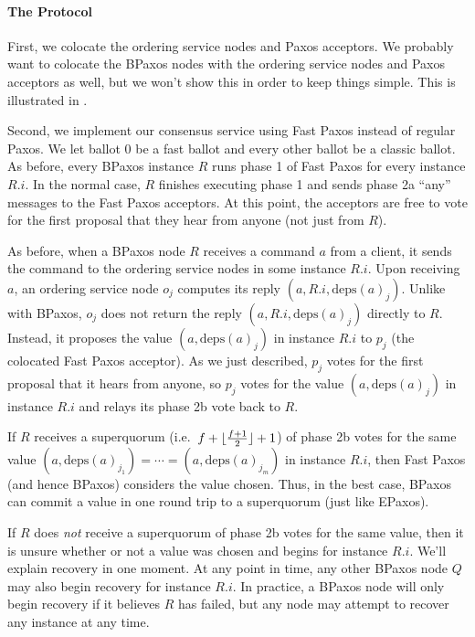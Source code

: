\documentclass{mwhittaker}
\theoremstyle{definition}
\newcommand{\deps}[1]{\text{deps}(#1)}
\begin{document}
\paragraph{The Protocol}
First, we colocate the ordering service nodes and Paxos acceptors. We probably
want to colocate the BPaxos nodes with the ordering service nodes and Paxos
acceptors as well, but we won't show this in order to keep things simple. This
is illustrated in .

{}

Second, we implement our consensus service using Fast Paxos instead of regular
Paxos. We let ballot $0$ be a fast ballot and every other ballot be a classic
ballot. As before, every BPaxos instance $R$ runs phase 1 of Fast Paxos for
every instance $R.i$. In the normal case, $R$ finishes executing phase 1 and
sends phase 2a ``any'' messages to the Fast Paxos acceptors. At this point, the
acceptors are free to vote for the first proposal that they hear from anyone
(not just from $R$).

As before, when a BPaxos node $R$ receives a command $a$ from a client, it
sends the command to the ordering service nodes in some instance $R.i$. Upon
receiving $a$, an ordering service node $o_j$ computes its reply $(a, R.i,
\deps{a}_j)$. Unlike with BPaxos, $o_j$ does not return the reply $(a, R.i,
\deps{a}_j)$ directly to $R$. Instead, it proposes the value $(a, \deps{a}_j)$
in instance $R.i$ to $p_j$ (the colocated Fast Paxos acceptor). As we just
described, $p_j$ votes for the first proposal that it hears from anyone, so
$p_j$ votes for the value $(a, \deps{a}_j)$ in instance $R.i$ and relays its
phase 2b vote back to $R$.

If $R$ receives a superquorum (i.e.\ $f + \lfloor\frac{f+1}{2}\rfloor + 1$) of phase
2b votes for the same value $(a, \deps{a}_{j_1}) = \cdots = (a,
\deps{a}_{j_{m}})$ in instance $R.i$, then Fast Paxos (and hence BPaxos)
considers the value chosen. Thus, in the best case, BPaxos can commit a value
in one round trip to a superquorum (just like EPaxos).

If $R$ does \emph{not} receive a superquorum of phase 2b votes for the same
value, then it is unsure whether or not a value was chosen and begins
 for instance $R.i$. We'll explain recovery in one moment. At
any point in time, any other BPaxos node $Q$ may also begin recovery for
instance $R.i$. In practice, a BPaxos node will only begin recovery if it
believes $R$ has failed, but any node may attempt to recover any instance at
any time.
\end{document}
